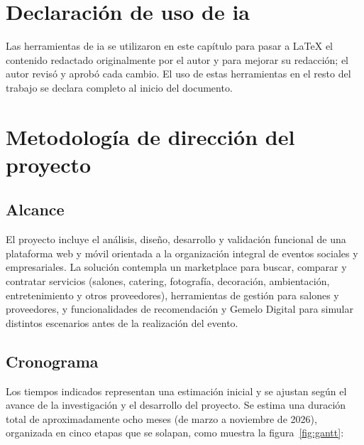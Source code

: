 \section{Declaración de uso de \acrshort{ia}}

Las herramientas de \gls{ia} se utilizaron en este capítulo para pasar a
LaTeX el contenido redactado originalmente por el autor y para mejorar
su redacción; el autor revisó y aprobó cada cambio. El uso de estas
herramientas en el resto del trabajo se declara completo al inicio del
documento.

\section{Metodología de dirección del proyecto}

\subsection{Alcance}

El proyecto incluye el análisis, diseño, desarrollo y validación
funcional de una plataforma web y móvil orientada a la organización
integral de eventos sociales y empresariales. La solución contempla un
marketplace para buscar, comparar y contratar servicios (salones,
catering, fotografía, decoración, ambientación, entretenimiento y otros
proveedores), herramientas de gestión para salones y proveedores, y
funcionalidades de recomendación y Gemelo Digital para
simular distintos escenarios antes de la realización del evento.

\subsection{Cronograma}

Los tiempos indicados representan una estimación inicial y se ajustan
según el avance de la investigación y el desarrollo del proyecto. Se
estima una duración total de aproximadamente ocho meses (de marzo a
noviembre de 2026), organizada en cinco etapas que se solapan, como
muestra la figura~\ref{fig:gantt}:

